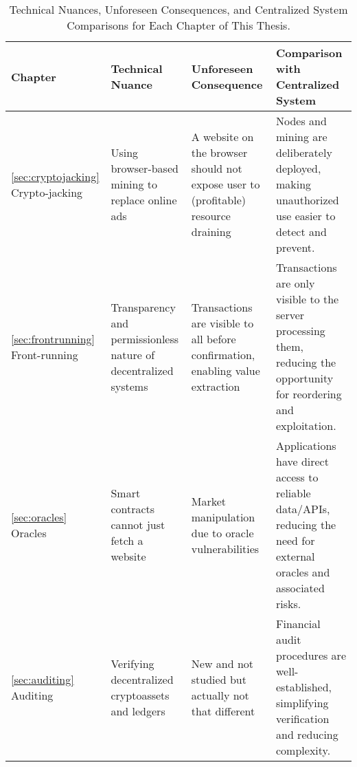 \begin{table}[t]
    \centering
    \begin{adjustbox}{width=\textwidth}
    \begin{tabular}{|p{3cm}|p{4.25cm}|p{5.25cm}|p{5cm}|}
        \hline
        \rowcolor{lightgray}
        \textbf{Chapter} & \textbf{Technical Nuance} & \textbf{Unforeseen Consequence} & \textbf{Comparison with Centralized System} \\ \hline
        
        \ref{sec:cryptojacking} Crypto-jacking &
        Using browser-based \newline mining  to replace online ads &
        A website on the browser should not expose user to (profitable) resource draining &
        Nodes and mining are deliberately deployed, making unauthorized use easier to detect and prevent. \\ \hline
        
        \ref{sec:frontrunning} Front-running &
        Transparency and \newline permissionless nature of decentralized systems &
        Transactions are visible to all before confirmation, enabling value extraction &
        Transactions are only visible to the server processing them, reducing the opportunity for reordering and exploitation. \\ \hline
        
        \ref{sec:oracles} Oracles &
        Smart contracts cannot just fetch a website &
        Market manipulation due to oracle vulnerabilities &
        Applications have direct access to reliable data/APIs, reducing the need for external oracles and associated risks. \\ \hline
        
        \ref{sec:auditing} Auditing &
        Verifying decentralized cryptoassets and ledgers &
        New and not studied but \newline actually not that different &
        Financial audit procedures are well-established, simplifying verification and reducing complexity. \\ \hline
    \end{tabular}
    \end{adjustbox}
    \caption[Nuances, Unforeseen Consequences, and Centralized Systems]{Technical Nuances, Unforeseen Consequences, and Centralized System Comparisons for Each Chapter of This Thesis.}
    \label{tab:technical_nuances}
\end{table}



